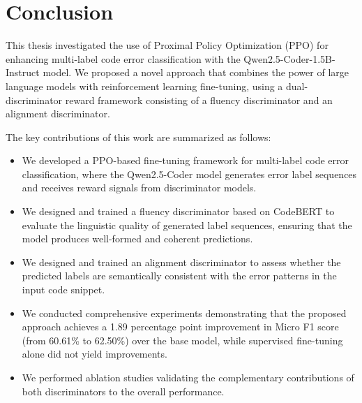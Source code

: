 \chapter{Conclusion}
\begingroup
\justifying
\setlength{\parindent}{0pt}
\setlength{\parskip}{0.5\baselineskip}
\titlespacing{\chapter}{0pt}{0pt}{0pt}
\titlespacing{\section}{0pt}{0pt}{0pt}

This thesis investigated the use of Proximal Policy Optimization (PPO) for enhancing multi-label code error classification with the Qwen2.5-Coder-1.5B-Instruct model. We proposed a novel approach that combines the power of large language models with reinforcement learning fine-tuning, using a dual-discriminator reward framework consisting of a fluency discriminator and an alignment discriminator.

The key contributions of this work are summarized as follows:

\begin{itemize}
    \item We developed a PPO-based fine-tuning framework for multi-label code error classification, where the Qwen2.5-Coder model generates error label sequences and receives reward signals from discriminator models.
    \item We designed and trained a fluency discriminator based on CodeBERT to evaluate the linguistic quality of generated label sequences, ensuring that the model produces well-formed and coherent predictions.
    \item We designed and trained an alignment discriminator to assess whether the predicted labels are semantically consistent with the error patterns in the input code snippet.
    \item We conducted comprehensive experiments demonstrating that the proposed approach achieves a 1.89 percentage point improvement in Micro F1 score (from 60.61\% to 62.50\%) over the base model, while supervised fine-tuning alone did not yield improvements.
    \item We performed ablation studies validating the complementary contributions of both discriminators to the overall performance.
\end{itemize}


